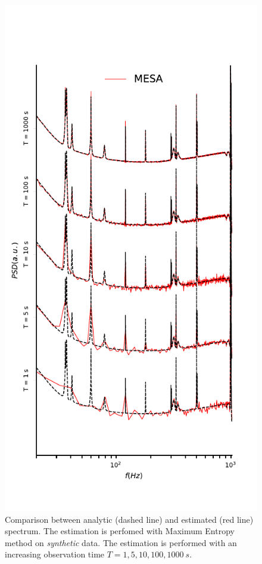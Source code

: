 \documentclass[twocolumn,showpacs,preprintnumbers,nofootinbib,prd,
superscriptaddress,10pt]{revtex4-1}
\begin{document}
\begin{figure}[!t]
	\caption{Comparison between analytic (dashed line) and estimated (red line) spectrum. The estimation is perfomed with Maximum Entropy method on \textit{synthetic} data. The estimation is performed with an increasing observation time $T = 1, 5, 10, 100, \SI{1000}{s}$.}
	\label{fig:MESA_LIGO_data}
	\includegraphics{Images/comparison_LVC_data/comparison_LVC_data_MESA.pdf}
\end{figure}
\end{document}
